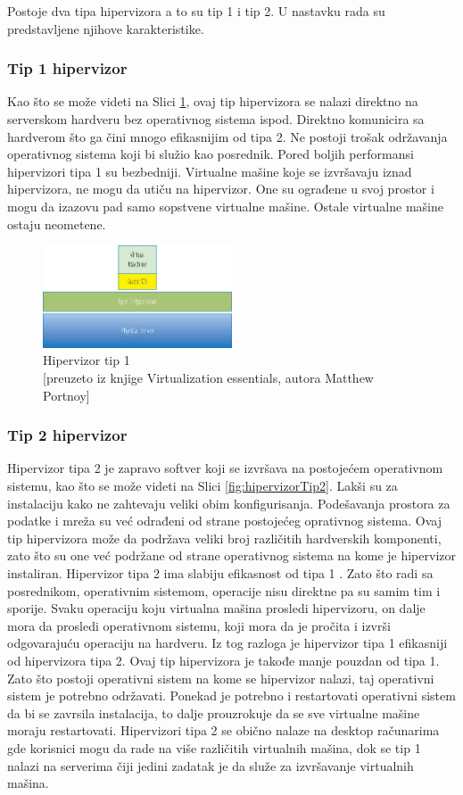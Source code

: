 \documentclass[12pt,oneside]{memoir}
\begin{document}
Postoje dva tipa hipervizora a to su tip 1 i tip 2. U nastavku rada su predstavljene njihove karakteristike.
 
\subsubsection{Tip 1 hipervizor}
Kao što se može videti na Slici \ref{fig:hipervizorTip1}, ovaj tip hipervizora se nalazi direktno na serverskom hardveru bez operativnog sistema ispod. Direktno komunicira sa hardverom što ga čini mnogo efikasnijim od tipa 2. Ne postoji trošak održavanja operativnog sistema koji bi služio kao posrednik. Pored boljih performansi hipervizori tipa 1 su bezbedniji. Virtualne mašine koje se izvršavaju iznad hipervizora, ne mogu da utiču na hipervizor. One su ograđene u svoj prostor i mogu da izazovu pad samo sopstvene virtualne mašine. Ostale virtualne mašine ostaju neometene.
\begin{figure}[!ht]
  \centering
  \includegraphics[width=0.5\textwidth]{Slika 2.jpg}
  \caption{Hipervizor tip 1\\\footnotesize[preuzeto iz knjige Virtualization essentials, autora Matthew Portnoy]}
  \label{fig:hipervizorTip1}
\end{figure}


\subsubsection{Tip 2 hipervizor}
Hipervizor tipa 2 je zapravo softver koji se izvršava na postojećem operativnom sistemu, kao što se može videti na Slici \ref{fig:hipervizorTip2}. Lakši su za instalaciju kako ne zahtevaju veliki obim konfigurisanja. Podešavanja prostora za podatke i mreža su već odrađeni od strane postojećeg oprativnog sistema. Ovaj tip hipervizora može da podržava veliki broj različitih hardverskih komponenti, zato što su one već podržane od strane operativnog sistema na kome je hipervizor instaliran. Hipervizor tipa 2 ima slabiju efikasnost od tipa 1 \cite{ve}. Zato što radi sa posrednikom, operativnim sistemom, operacije nisu direktne pa su samim tim i sporije. Svaku operaciju koju virtualna mašina prosledi hipervizoru, on dalje mora da prosledi operativnom sistemu, koji mora da je pročita i izvrši odgovarajuću operaciju na hardveru. Iz tog razloga je hipervizor tipa 1 efikasniji od hipervizora tipa 2. 
Ovaj tip hipervizora je takođe manje pouzdan od tipa 1. Zato što postoji operativni sistem na kome se hipervizor nalazi, taj operativni sistem je potrebno održavati. Ponekad je potrebno i restartovati operativni sistem da bi se zavrsila instalacija, to dalje prouzrokuje da se sve virtualne mašine moraju restartovati. Hipervizori tipa 2 se obično nalaze na desktop računarima gde korisnici mogu da rade na više različitih virtualnih mašina, dok se tip 1 nalazi na serverima čiji jedini zadatak je da služe za izvršavanje virtualnih mašina.
\end{document}
